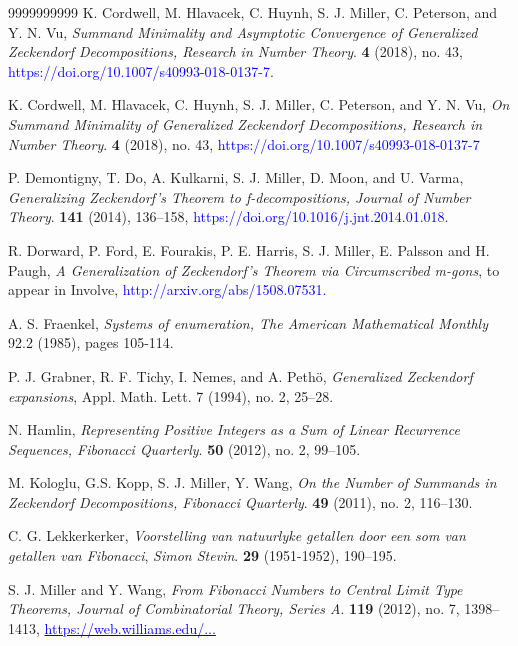 \documentclass[]{interact}
\theoremstyle{plain}
\numberwithin{equation}{section} %
\numberwithin{table}{section} %
\numberwithin{figure}{section}
\begin{document}
\begin{thebibliography}{9999999999}
 K. Cordwell, M. Hlavacek, C. Huynh, S. J. Miller, C. Peterson, and Y. N. Vu, \textit{Summand Minimality and Asymptotic Convergence of Generalized Zeckendorf Decompositions, Research in Number Theory}. \textbf{4} (2018), no. 43, \textcolor{blue}{https://doi.org/10.1007/s40993-018-0137-7.}

 K. Cordwell, M. Hlavacek, C. Huynh, S. J. Miller, C. Peterson, and Y. N. Vu, \textit{On Summand Minimality of Generalized Zeckendorf Decompositions, Research in Number Theory}. \textbf{4} (2018), no. 43, \textcolor{blue}{https://doi.org/10.1007/s40993-018-0137-7}

 P. Demontigny, T. Do, A. Kulkarni, S. J. Miller, D. Moon, and U. Varma, \textit{Generalizing Zeckendorf's Theorem to f-decompositions, Journal of Number Theory}. \textbf{141} (2014), 136--158, \textcolor{blue}{https://doi.org/10.1016/j.jnt.2014.01.018.}

 R. Dorward, P. Ford, E. Fourakis, P. E. Harris, S. J. Miller, E. Palsson and H. Paugh, \textit{A Generalization of Zeckendorf’s Theorem via Circumscribed m-gons}, to appear in Involve, \textcolor{blue}{http://arxiv.org/abs/1508.07531.}

 A. S. Fraenkel, \textit{Systems of enumeration, The American Mathematical Monthly} 92.2 (1985), pages 105-114.

 P. J. Grabner, R. F. Tichy, I. Nemes, and A. Pethö, \textit{Generalized Zeckendorf expansions}, Appl. Math. Lett. 7 (1994), no. 2, 25–28.

 N. Hamlin, \textit{Representing Positive Integers as a Sum of Linear Recurrence Sequences, Fibonacci Quarterly}. \textbf{50} (2012), no. 2, 99–105.

 M. Kologlu, G.S. Kopp, S. J. Miller, Y. Wang, \textit{On the Number of Summands in Zeckendorf Decompositions, Fibonacci Quarterly}. \textbf{49} (2011), no. 2, 116--130.

 C. G. Lekkerkerker, \textit{Voorstelling van natuurlyke getallen door een som van getallen van Fibonacci}, \textit{Simon Stevin}. \textbf{29} (1951-1952), 190--195.


 S. J. Miller and Y. Wang, \textit{From Fibonacci Numbers to Central Limit Type Theorems, Journal of Combinatorial Theory, Series A}. \textbf{119} (2012), no. 7, 1398--1413,
\href{https://web.williams.edu/Mathematics/sjmiller/public_html/math/papers/MillerWang_FibToCLT80arxivrevised.pdf}{\textcolor{blue}{https://web.williams.edu/...}}


\end{thebibliography}
\end{document}
